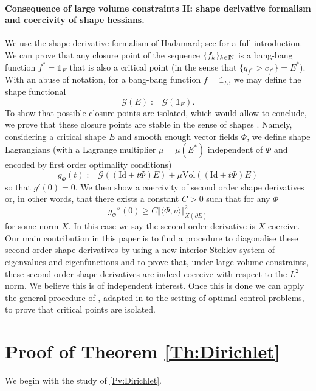 \documentclass{article}
\newcommand{\N}{\textnormal{I\kern-0.21emN}}
\renewcommand{\geq}{\geqslant}
\numberwithin{equation}{section}
\begin{document}
\paragraph{Consequence of large volume constraints II: shape derivative formalism and coercivity of shape hessians.}
We use the shape derivative formalism of Hadamard; see \cite[Chapter 5]{HenrotPierre} for a full introduction. We can prove that any closure point of the sequence $\{f_k\}_{k\in \N}$ is a bang-bang function $f^*=\mathds 1_E$ that is also a critical point (in the sense that $\{q_{f^*}>c_{f^*}\}=E^*$). With an abuse of notation, for a bang-bang function $f=\mathds 1_E$, we may define the shape functional 
\[\mathcal G(E):=\mathcal G(\mathds 1_E).\]
To show that possible closure points are isolated, which would allow to conclude, we prove that these closure points are stable in the sense of shapes \cite{DambrineLamboley}. Namely, considering a critical shape $E$ and smooth enough vector fields $\Phi$, we define shape Lagrangians (with a Lagrange multiplier $\mu=\mu(E^*)$ independent of $\Phi$ and encoded by first order optimality conditions)
\[ g_\Phi(t):=\mathcal G\left((\mathrm{Id}+t\Phi)E\right)+\mu \mathrm{Vol}\left((\mathrm{Id}+t\Phi)E\right)\] so that $g'(0)=0$. We then show a coercivity of second order shape derivatives or, in other words, that there exists a constant $C>0$ such that for any $\Phi$
\[ g_\Phi''(0)\geq C \Vert \langle \Phi,\nu\rangle\Vert_{X(\partial E)}^2\] for some norm $X$. In this case we say the second-order derivative is $X$-coercive. Our main contribution in this paper is to find a procedure to diagonalise these second order shape derivatives by using a new interior Steklov system of eigenvalues and eigenfunctions and to prove that, under large volume constraints, these second-order shape derivatives are indeed coercive with respect to the $L^2$-norm.  We believe this is of independent interest. Once this is done we can apply the general procedure of \cite{DambrineLamboley}, adapted in \cite{MazariQuantitative,MazariNLA,MRB2020} to the setting of optimal control problems, to prove that critical points are isolated. %

\section{Proof of Theorem \ref{Th:Dirichlet}}
We begin with the study of \eqref{Pv:Dirichlet}.
\end{document}
